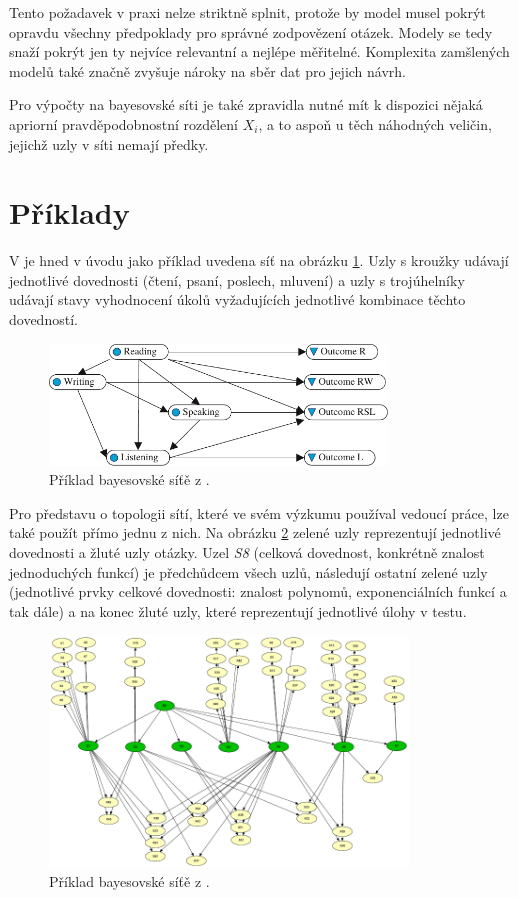 \documentclass[a4paper,twoside,12pt]{book}
\begin{document}
Tento požadavek v praxi nelze striktně splnit, protože by model musel pokrýt opravdu všechny předpoklady pro správné zodpovězení otázek. Modely se tedy snaží pokrýt jen ty nejvíce relevantní a nejlépe měřitelné. Komplexita zamšlených modelů také značně zvyšuje nároky na sběr dat pro jejich návrh.

Pro výpočty na bayesovské síti je také zpravidla nutné mít k dispozici nějaká apriorní pravděpodobnostní rozdělení $X_i$, a to aspoň u těch náhodných veličin, jejichž uzly v síti nemají předky.

\section{Příklady}
\label{sec:net_examples}
V \cite{almond_tlustospis} je hned v úvodu jako příklad uvedena síť na obrázku \ref{fig:almond_BN_example}. Uzly s kroužky udávají jednotlivé dovednosti (čtení, psaní, poslech, mluvení) a uzly s trojúhelníky udávají stavy vyhodnocení úkolů vyžadujících jednotlivé kombinace těchto dovedností.

\begin{figure}
  \centering
    \includegraphics[width=0.8\textwidth]{almond_BN_example.pdf}
  \caption{Příklad bayesovské síťě z \cite{almond_tlustospis}.}
  \label{fig:almond_BN_example}
\end{figure}

Pro představu o topologii sítí, které ve svém výzkumu používal vedoucí práce, lze také použít přímo jednu z nich. Na obrázku \ref{fig:plajner16} zelené uzly reprezentují jednotlivé dovednosti a žluté uzly otázky. Uzel \emph{S8} (celková dovednost, konkrétně znalost jednoduchých funkcí) je předchůdcem všech uzlů, následují ostatní zelené uzly (jednotlivé prvky celkové dovednosti: znalost polynomů, exponenciálních funkcí a tak dále) a na konec žluté uzly, které reprezentují jednotlivé úlohy v testu.

\begin{figure}
  \centering
    \includegraphics[width=0.85\textwidth]{complex_BN_plajner16.pdf}
  \caption{Příklad bayesovské síťě z \cite{plajner16}.}
  \label{fig:plajner16}
\end{figure}
\end{document}
